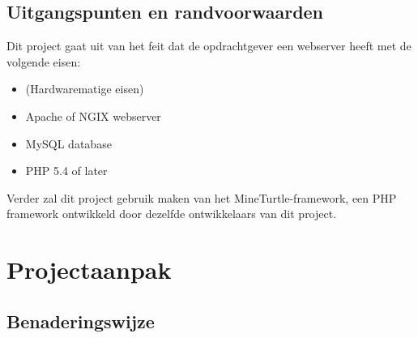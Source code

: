 \documentclass{verslag}
\begin{document}
    \subsection{Uitgangspunten en randvoorwaarden} %
    \label{sub:uitgangspunten_en_randvoorwaarden}
    Dit project gaat uit van het feit dat de opdrachtgever een webserver heeft met de volgende eisen:
        \begin{itemize}
            \item (Hardwarematige eisen)
            \item Apache of NGIX webserver
            \item MySQL database
            \item PHP 5.4 of later
        \end{itemize}
    Verder zal dit project gebruik maken van het MineTurtle-framework, een PHP framework ontwikkeld door dezelfde ontwikkelaars van dit project.


\section{Projectaanpak} %
\label{sec:projectaanpak}
    \subsection{Benaderingswijze} %
    \label{sub:benaderingswijze}
    
\end{document}
